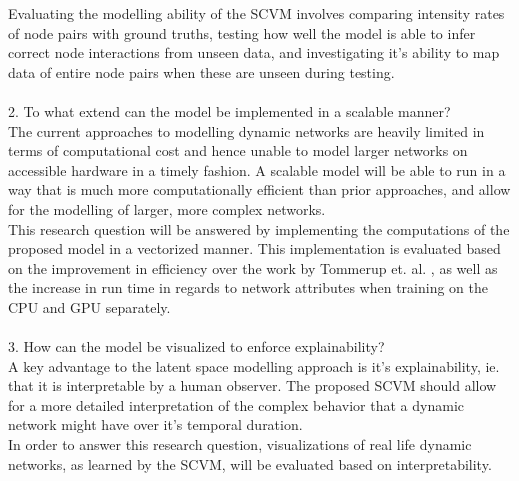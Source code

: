 Evaluating the modelling ability of the SCVM involves comparing intensity rates of node pairs with ground truths, testing how well the model is able to infer correct node interactions from unseen data, and investigating it's ability to map data of entire node pairs when these are unseen during testing.
\\\\
2. To what extend can the model be implemented in a scalable manner?
\\
The current approaches to modelling dynamic networks are heavily limited in terms of computational cost and hence unable to model larger networks on accessible hardware in a timely fashion.
A scalable model will be able to run in a way that is much more computationally efficient than prior approaches, and allow for the modelling of larger, more complex networks.
\\
This research question will be answered by implementing the computations of the proposed model in a vectorized manner.
This implementation is evaluated based on the improvement in efficiency over the work by Tommerup et. al. \cite{Tommerup2021LearningNetworks}, as well as the increase in run time in regards to network attributes when training on the CPU and GPU separately.
\\\\
3. How can the model be visualized to enforce explainability?
\\
A key advantage to the latent space modelling approach is it's explainability, ie. that it is interpretable by a human observer.
The proposed SCVM should allow for a more detailed interpretation of the complex behavior that a dynamic network might have over it's temporal duration.
\\
In order to answer this research question, visualizations of real life dynamic networks, as learned by the SCVM, will be evaluated based on interpretability. 



